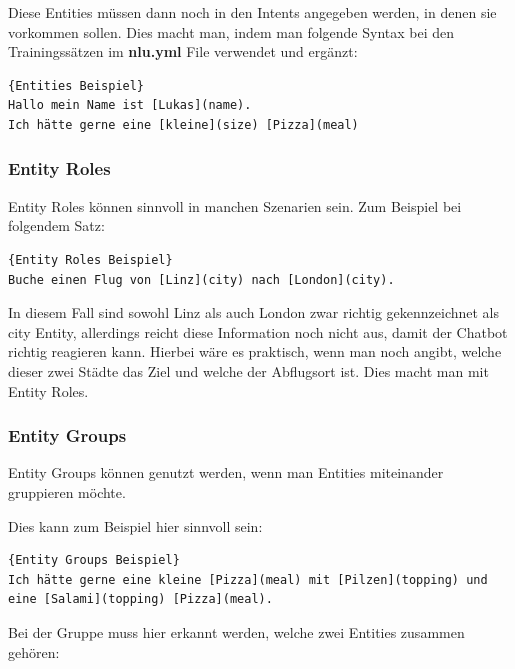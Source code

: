 Diese Entities müssen dann noch in den Intents angegeben werden, in denen sie vorkommen sollen.
Dies macht man, indem man folgende Syntax bei den Trainingssätzen im \textbf{nlu.yml} File verwendet und ergänzt:

\begin{lstlisting}[label={lst:entities-nlu-example},caption={Entities Beispiel}]{Entities Beispiel}
Hallo mein Name ist [Lukas](name).
Ich hätte gerne eine [kleine](size) [Pizza](meal)
\end{lstlisting}

\subsubsection{Entity Roles}

Entity Roles können sinnvoll in manchen Szenarien sein.
Zum Beispiel bei folgendem Satz:

\begin{lstlisting}[label={lst:entity-roles-example},caption={Entity Roles Beispiel}]{Entity Roles Beispiel}
Buche einen Flug von [Linz](city) nach [London](city).
\end{lstlisting}

In diesem Fall sind sowohl Linz als auch London zwar richtig gekennzeichnet als city Entity, allerdings reicht diese Information noch nicht aus, damit der Chatbot richtig reagieren kann.
Hierbei wäre es praktisch, wenn man noch angibt, welche dieser zwei Städte das Ziel und welche der Abflugsort ist.
Dies macht man mit Entity Roles.\cite{entityRolesGroups}

\subsubsection{Entity Groups}

Entity Groups können genutzt werden, wenn man Entities miteinander gruppieren möchte.\cite{entityRolesGroups}

Dies kann zum Beispiel hier sinnvoll sein:

\begin{lstlisting}[label={lst:entity-groups-example},caption={Entity Groups Beispiel}]{Entity Groups Beispiel}
Ich hätte gerne eine kleine [Pizza](meal) mit [Pilzen](topping) und eine [Salami](topping) [Pizza](meal).
\end{lstlisting}

Bei der Gruppe muss hier erkannt werden, welche zwei Entities zusammen gehören\cite{entityRolesGroups}:

